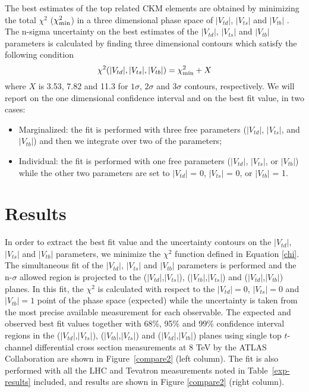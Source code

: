 \documentclass[11pt]{article}
\newcommand{\VTD}{|V_{td}|}
\newcommand{\VTS}{|V_{ts}|}
\newcommand{\VTB}{|V_{tb}|}
\begin{document}
The best estimates of  the top related CKM elements are obtained by minimizing the total $\chi^2$ ($\chi^2_{\rm min}$) in a three dimensional phase space of $\VTD$, $\VTS$ and $\VTB$ .
The n-sigma uncertainty on the best estimates of the $\VTD$, $\VTS$ and $\VTB$ parameters is calculated by finding three dimensional contours which satisfy the following condition
\begin{equation}
  \chi^2(\VTD,\VTS,\VTB) =  \chi^2_{\rm min} + X
\end{equation}
where $X$ is  3.53, 7.82 and 11.3 for $1\sigma$, $2\sigma$ and $3\sigma$ contours, respectively.
We will report on the one dimensional confidence interval and on the best fit value, in two cases:
\begin{itemize}
\item Marginalized: the fit is performed with three free parameters ($\VTD$, $\VTS$, and $\VTB$) and then we integrate over two of the parameters;
\item Individual: the fit is performed with one free parameters ($\VTD$, $\VTS$, or $\VTB$) while the other two parameters are set to $\VTD$ = 0, $\VTS$ = 0, or $\VTB$ = 1.
\end{itemize}


\section{Results}
\label{result}

In order to extract the best fit value and the uncertainty contours  on the $\VTD$, $\VTS$ and $\VTB$ parameters, we minimize the $\chi^2$ function defined in Equation \ref{chi}.
The simultaneous fit of the $\VTD$, $\VTS$ and $\VTB$ parameters is performed and the n-$\sigma$ allowed region is projected to the ($\VTD$,$\VTS$), ($\VTB$,$\VTS$) and ($\VTD$,$\VTB$) planes.
In this fit, the $\chi^2$  is calculated with respect to the $\VTD=0$, $\VTS=0$ and $\VTB=1$ point  of the phase space (expected) while the uncertainty is taken from the most precise available measurement for each observable.
The expected and observed best fit values together with 68\%, 95\% and 99\% confidence interval regions in the ($\VTD$,$\VTS$), ($\VTB$,$\VTS$) and ($\VTD$,$\VTB$) planes using single top $t$-channel differential cross section measurements at 8 TeV by the ATLAS Collaboration are shown in Figure~\ref{compare2} (left column). The fit is also performed with all the  LHC and Tevatron measurements noted in Table~\ref{exp-results} included, and results are shown in Figure \ref{compare2} (right column).
\end{document}
